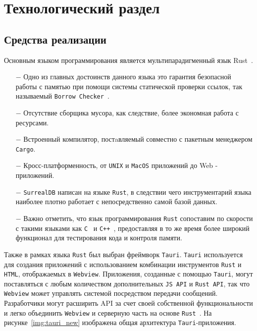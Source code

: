 \section{Технологический раздел}

\subsection{Средства реализации}

Основным языком программирования является мультипарадигменный язык Rust~\cite{rust}.
\begin{itemize}
    \item[$-$] Одно из главных достоинств данного языка это гарантия безопасной работы с памятью при помощи системы
            статической проверки ссылок, так называемый \texttt{Borrow Checker}~\cite{borrow-checker}.
    \item[$-$] Отсутствие сборщика мусора, как следствие, более экономная работа с ресурсами.
    \item[$-$] Встроенный компилятор, постaвляемый совместно с пакетным менеджером \texttt{Cargo}.
    \item[$-$] Кросс-платформенность, от \texttt{UNIX} и \texttt{MacOS} приложений до Web - приложений.
    \item[$-$] \texttt{SurrealDB} написан на языке \texttt{Rust}, в следствии чего инструментарий языка наиболее плотно работает с непосредственно самой базой данных.
    \item[$-$] Важно отметить, что язык программирования \texttt{Rust} сопоставим по скорости с такими языками как \texttt{С}~\cite{c-rust} и \texttt{С++}~\cite{cpp-rust},
    предоставляя в то же время более широкий функционал для тестирования кода и контроля памяти.
\end{itemize}

Также в рамках языка \texttt{Rust} был выбран фреймворк \texttt{Tauri}. 
\texttt{Tauri} используется для создания приложений с использованием комбинации инструментов \texttt{Rust} и \texttt{HTML}, отображаемых в \texttt{Webview}. 
Приложения, созданные с помощью \texttt{Tauri}, могут поставляться с любым количеством дополнительных \texttt{JS API} и \texttt{Rust API}, так что \texttt{Webview} может управлять системой посредством передачи сообщений. 
Разработчики могут расширить API за счет своей собственной функциональности и легко объединить \texttt{Webview} и серверную часть на основе \texttt{Rust}~\cite{tauri}.
На рисунке~\ref{img:tauri_new} изображена общая архитектура \texttt{Tauri}-приложения.

